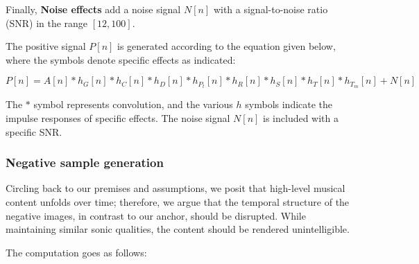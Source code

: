 Finally, \textbf{Noise effects} add a noise signal $N[n]$ with a signal-to-noise ratio (SNR) in the range $[12, 100]$.

The positive signal $P[n]$ is generated according to the equation given below, where the symbols denote specific effects as indicated:

\begin{equation}\label{eq:positive_signal}
P[n] = A[n] \ast h_{G}[n] \ast h_{C}[n] \ast h_{D}[n] \ast h_{P_t}[n] \ast h_{R}[n] \ast h_{S}[n] \ast h_{T}[n] \ast h_{T_m}[n] + N[n]
\end{equation}

The $\ast$ symbol represents convolution, and the various $h$ symbols indicate the impulse responses of specific effects. The noise signal $N[n]$ is included with a specific SNR.

\subsubsection{Negative sample generation}

Circling back to our premises and assumptions, we posit that high-level musical content unfolds over time; therefore, we argue that the temporal structure of the negative images, in contrast to our anchor, should be disrupted. While maintaining similar sonic qualities, the content should be rendered unintelligible.

The computation goes as follows:

